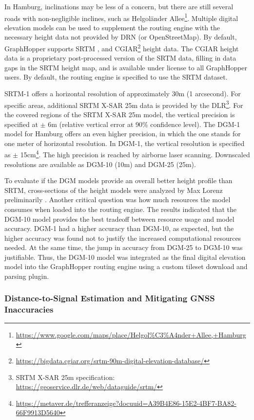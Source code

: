 In Hamburg, inclinations may be less of a concern, but there are still several roads with non-negligible inclines, such as Helgoländer Allee\footnote{\url{https://www.google.com/maps/place/Helgol\%C3\%A4nder+Allee,+Hamburg}}. Multiple digital elevation models can be used to supplement the routing engine with the necessary height data not provided by DRN (or OpenStreetMap). By default, GraphHopper supports SRTM \cite{farr_shuttle_2000, farr_shuttle_2007}, and CGIAR\footnote{\url{https://bigdata.cgiar.org/srtm-90m-digital-elevation-database/}} height data. The CGIAR height data is a proprietary post-processed version of the SRTM data, filling in data gaps in the SRTM height map, and is available under license to all GraphHopper users. By default, the routing engine is specified to use the SRTM dataset.

SRTM-1 offers a horizontal resolution of approximately 30m (1 arcsecond). For specific areas, additional SRTM X-SAR 25m data is provided by the DLR\footnote{SRTM X-SAR 25m specification: \url{https://geoservice.dlr.de/web/dataguide/srtm/}}. For the covered regions of the SRTM X-SAR 25m model, the vertical precision is specified at $\pm$ 6m (relative vertical error at 90\% confidence level). The DGM-1 model for Hamburg offers an even higher precision, in which the one stands for one meter of horizontal resolution. In DGM-1, the vertical resolution is specified as $\pm$ 15cm\footnote{\url{https://metaver.de/trefferanzeige?docuuid=A39B4E86-15E2-4BF7-BA82-66F9913D5640}}. The high precision is reached by airborne laser scanning. Downscaled resolutions are available as DGM-10 (10m) and DGM-25 (25m).

To evaluate if the DGM models provide an overall better height profile than SRTM, cross-sections of the height models were analyzed by Max Lorenz preliminarily \cite{lorenz_2022}. Another critical question was how much resources the model consumes when loaded into the routing engine. The results indicated that the DGM-10 model provides the best tradeoff between resource usage and model accuracy. DGM-1 had a higher accuracy than DGM-10, as expected, but the higher accuracy was found not to justify the increased computational resources needed. At the same time, the jump in accuracy from DGM-25 to DGM-10 was justifiable. Thus, the DGM-10 model was integrated as the final digital elevation model into the GraphHopper routing engine using a custom tileset download and parsing plugin.

\subsubsection{Distance-to-Signal Estimation and Mitigating GNSS Inaccuracies}

